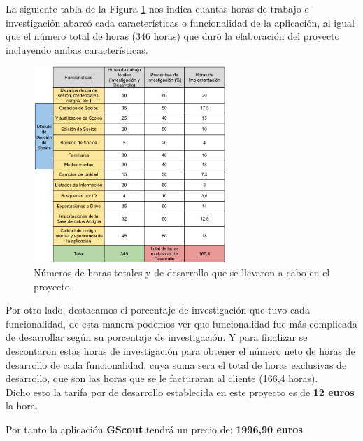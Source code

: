 


La siguiente tabla de la Figura \ref{fig:presupuesto} nos indica cuantas horas de trabajo e investigación abarcó cada características o funcionalidad de la aplicación, al igual que 
el número total de horas (346 horas) que duró la elaboración del proyecto incluyendo ambas características. \\

\begin{figure}[H]
\begin{center}
\includegraphics[width=0.65\textwidth]{images/presupuesto.jpg}
\caption{Números de horas totales y de desarrollo que se llevaron a cabo en el proyecto}
\label{fig:presupuesto}
\end{center}
\end{figure}

\newpage

Por otro lado, destacamos el porcentaje de investigación que tuvo cada funcionalidad, de esta manera podemos ver que funcionalidad fue más complicada de
desarrollar según su porcentaje de investigación. Y para finalizar se descontaron estas horas de investigación para obtener el número neto de horas de desarrollo de cada funcionalidad, cuya suma sera el 
total de horas exclusivas de desarrollo, que son las horas que se le facturaran al cliente (166,4 horas).\\


Dicho esto la tarifa por de desarrollo establecida en este proyecto es de \textbf{12 euros} la hora.\\

\bigskip

Por tanto la aplicación \textbf{GScout} tendrá un precio de: {\Huge \textbf{1996,90 euros}}\\


